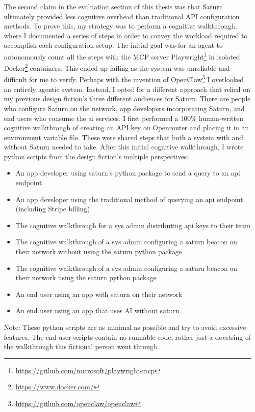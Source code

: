 The second claim in the evaluation section of this thesis was that Saturn ultimately provided less cognitive overhead than traditional API configuration methods. To prove this, my strategy was to perform a cognitive walkthrough, where I documented a series of steps in order to convey the workload required to accomplish each configuration setup. The initial goal was for an agent to autonomously count all the steps with the MCP server Playwright\footnote{\url{https://github.com/microsoft/playwright-mcp}} in isolated Docker\footnote{\url{https://www.docker.com/}} containers. This ended up failing as the system was unreliable and difficult for me to verify. Perhaps with the invention of OpenClaw\footnote{\url{https://github.com/openclaw/openclaw}} I overlooked an entirely agentic system. Instead, I opted for a different approach that relied on my previous design fiction's three different audiences for Saturn. There are people who configure Saturn on the network, app developers incorporating Saturn, and end users who consume the ai services. I first performed a 100\% human-written cognitive walkthrough of creating an API key on Openrouter and placing it in an environment variable file. These were shared steps that both a system with and without Saturn needed to take. After this initial cognitive walkthrough, I wrote python scripts from the design fiction's multiple perspectives:

\begin{itemize}
\item An app developer using saturn's python package to send a query to an api endpoint
\item An app developer using the traditional method of querying an api endpoint (including Stripe billing)
\item The cognitive walkthrough for a sys admin distributing api keys to their team
\item The cognitive walkthrough of a sys admin configuring a saturn beacon on their network without using the saturn python package
\item The cognitive walkthrough of a sys admin configuring a saturn beacon on their network using the saturn python package
\item An end user using an app with saturn on their network
\item An end user using an app that uses AI without saturn
\end{itemize}

Note: These python scripts are as minimal as possible and try to avoid excessive features. The end user scripts contain no runnable code, rather just a docstring of the walkthrough this fictional person went through.

